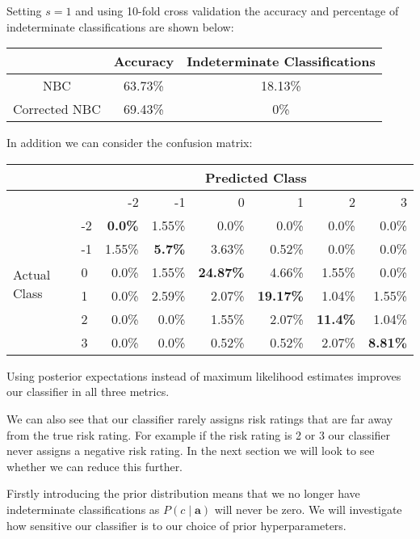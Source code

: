 Setting $s=1$ and using 10-fold cross validation the accuracy and percentage of indeterminate classifications are shown below:
\begin{center}
	\begin{tabular}{ c|c c }
		              & Accuracy & Indeterminate Classifications \\
		\hline
		NBC           & 63.73\%  & 18.13\%                       \\
		Corrected NBC & 69.43\%  & 0\%
	\end{tabular}
\end{center}

In addition we can consider the confusion matrix:
\begin{center}
    \begin{tabular}{l l r r r r r r}
    \hline
                       &    & \multicolumn{6}{c}{Predicted Class}                   \\
    \hline
                       &    & -2      & -1    & 0       & 1       & 2       & 3     \\
    \hline
    \multirow{6}{*}{Actual Class} & -2 & \textbf{0.0\%}  & 1.55\% & 0.0\%   & 0.0\%   & 0.0\%  & 0.0\%  \\
                       & -1 & 1.55\% & \textbf{5.7\%}   & 3.63\%  & 0.52\%  & 0.0\%  & 0.0\%  \\
                       & 0  & 0.0\%  & 1.55\% & \textbf{24.87\%}  & 4.66\%  & 1.55\% & 0.0\%  \\
                       & 1  & 0.0\%  & 2.59\% & 2.07\%  & \textbf{19.17\%}  & 1.04\% & 1.55\% \\
                       & 2  & 0.0\%  & 0.0\%  & 1.55\%  & 2.07\%  & \textbf{11.4\%}  & 1.04\% \\
                       & 3  & 0.0\%  & 0.0\%  & 0.52\%  & 0.52\%  & 2.07\% & \textbf{8.81\%} \\
    \hline
    \end{tabular}
\end{center}

Using posterior expectations instead of maximum likelihood estimates improves our classifier in all three metrics.

We can also see that our classifier rarely assigns risk ratings that are far away from the true risk rating.
For example if the risk rating is 2 or 3 our classifier never assigns a negative risk rating.
In the next section we will look to see whether we can reduce this further.

Firstly introducing the prior distribution means that we no longer have indeterminate classifications as $P(c \mid \mathbf{a})$ will never be zero.
We will investigate how sensitive our classifier is to our choice of prior hyperparameters.

